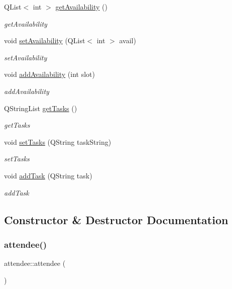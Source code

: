 \begin{DoxyCompactItemize}
Q\+List$<$ int $>$ \hyperlink{classattendee_a2ec27aa5e40dd1bab0123f0472f2fed0}{get\+Availability} ()
\begin{DoxyCompactList}\small\item\em get\+Availability \end{DoxyCompactList}\item 
void \hyperlink{classattendee_a7f9eed27b7b780b59cbbb6931e086ee9}{set\+Availability} (Q\+List$<$ int $>$ avail)
\begin{DoxyCompactList}\small\item\em set\+Availability \end{DoxyCompactList}\item 
void \hyperlink{classattendee_a0bae1f348a38a1fc8ca67a141f8c771c}{add\+Availability} (int slot)
\begin{DoxyCompactList}\small\item\em add\+Availability \end{DoxyCompactList}\item 
Q\+String\+List \hyperlink{classattendee_a69818adb55caa399615fa43b7b7f0588}{get\+Tasks} ()
\begin{DoxyCompactList}\small\item\em get\+Tasks \end{DoxyCompactList}\item 
void \hyperlink{classattendee_a9b172bfafdfeb9b36a6b4ea1ec78537a}{set\+Tasks} (Q\+String task\+String)
\begin{DoxyCompactList}\small\item\em set\+Tasks \end{DoxyCompactList}\item 
void \hyperlink{classattendee_ac80fc3f8fb032f0b856da59aaedeecab}{add\+Task} (Q\+String task)
\begin{DoxyCompactList}\small\item\em add\+Task \end{DoxyCompactList}\end{DoxyCompactItemize}


\subsection{Constructor \& Destructor Documentation}
\mbox{\label{classattendee_a9a40f413382f38d884f549e839d597be}} 
\subsubsection{\texorpdfstring{attendee()}{attendee()}\hspace{0.1cm}{\footnotesize\ttfamily [1/2]}}
{\footnotesize\ttfamily attendee\+::attendee (\begin{DoxyParamCaption}{ }\end{DoxyParamCaption})}



